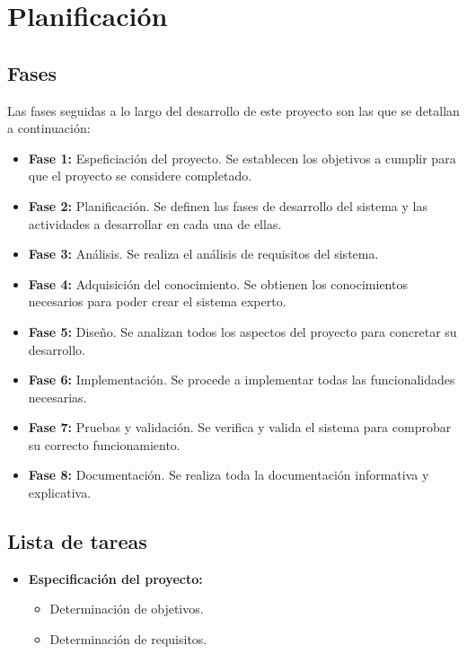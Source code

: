 \chapter{Planificación}

\section{Fases}

Las fases seguidas a lo largo del desarrollo de este proyecto son las que se detallan a continuación:

\begin{itemize}
	\item \textbf{Fase 1:} Espeficiación del proyecto. Se establecen los objetivos a cumplir para que el proyecto se considere completado.
	\item \textbf{Fase 2:} Planificación. Se definen las fases de desarrollo del sistema y las actividades a desarrollar en cada una de ellas.
	\item \textbf{Fase 3:} Análisis. Se realiza el análisis de requisitos del sistema. 
	\item \textbf{Fase 4:} Adquisición del conocimiento. Se obtienen los conocimientos necesarios para poder crear el sistema experto.
	\item \textbf{Fase 5:} Diseño. Se analizan todos los aspectos del proyecto para concretar su desarrollo.
	\item \textbf{Fase 6:} Implementación. Se procede a implementar todas las funcionalidades necesarias.
	\item \textbf{Fase 7:} Pruebas y validación. Se verifica y valida el sistema para comprobar su correcto funcionamiento.
	\item \textbf{Fase 8:} Documentación. Se realiza toda la documentación informativa y explicativa.
\end{itemize}


\section{Lista de tareas}

\begin{itemize}
	\item \textbf{Especificación del proyecto:}
	\begin{itemize}
		\item Determinación de objetivos.
		\item Determinación de requisitos.
	\end{itemize}
\end{itemize}

